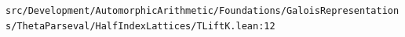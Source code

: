 \nolinkurl{src/Development/AutomorphicArithmetic/Foundations/GaloisRepresentations/ThetaParseval/HalfIndexLattices/TLiftK.lean:12}%
